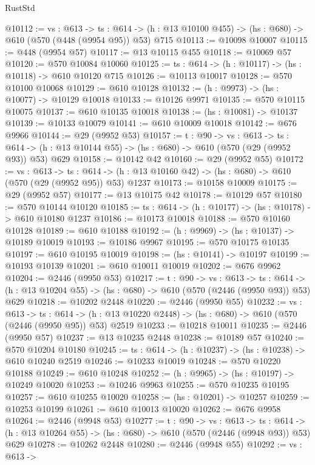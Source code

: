 \begin{lexlean}{RustStd}
\begin{coremodule}
@10112 := {vs : @613} ->
  {ts : @614} -> (h : @13 @10100 @455) -> (hs : @680) -> @610 (@570 (@448 (@9954 @95)) @53) @715
@10113 := @10098 @10007
@10115 := @448 (@9954 @57)
@10117 := @13 @10115 @455
@10118 := @10069 @57
@10120 := @570 @10084 @10060
@10125 := {ts : @614} -> (h : @10117) -> (hs : @10118) -> @610 @10120 @715
@10126 := @10113 @10017
@10128 := @570 @10100 @10068
@10129 := @610 @10128
@10132 := (h : @9973) -> (hs : @10077) -> @10129 @10018
@10133 := @10126 @9971
@10135 := @570 @10115 @10075
@10137 := @610 @10135 @10018
@10138 := (hs : @10081) -> @10137
@10139 := @10133 @10079
@10141 := @610 @10009 @10018
@10142 := @676 @9966
@10144 := @29 (@9952 @53)
@10157 := {t : @90} ->
  {vs : @613} ->
  {ts : @614} -> (h : @13 @10144 @55) -> (hs : @680) -> @610 (@570 (@29 (@9952 @93)) @53) @629
@10158 := @10142 @42
@10160 := @29 (@9952 @55)
@10172 := {vs : @613} ->
  {ts : @614} -> (h : @13 @10160 @42) -> (hs : @680) -> @610 (@570 (@29 (@9952 @95)) @53) @1237
@10173 := @10158 @10009
@10175 := @29 (@9952 @57)
@10177 := @13 @10175 @42
@10178 := @10129 @57
@10180 := @570 @10144 @10120
@10185 := {ts : @614} -> (h : @10177) -> (hs : @10178) -> @610 @10180 @1237
@10186 := @10173 @10018
@10188 := @570 @10160 @10128
@10189 := @610 @10188
@10192 := (h : @9969) -> (hs : @10137) -> @10189 @10019
@10193 := @10186 @9967
@10195 := @570 @10175 @10135
@10197 := @610 @10195 @10019
@10198 := (hs : @10141) -> @10197
@10199 := @10193 @10139
@10201 := @610 @10011 @10019
@10202 := @676 @9962
@10204 := @2446 (@9950 @53)
@10217 := {t : @90} ->
  {vs : @613} ->
  {ts : @614} -> (h : @13 @10204 @55) -> (hs : @680) -> @610 (@570 (@2446 (@9950 @93)) @53) @629
@10218 := @10202 @2448
@10220 := @2446 (@9950 @55)
@10232 := {vs : @613} ->
  {ts : @614} -> (h : @13 @10220 @2448) -> (hs : @680) -> @610 (@570 (@2446 (@9950 @95)) @53) @2519
@10233 := @10218 @10011
@10235 := @2446 (@9950 @57)
@10237 := @13 @10235 @2448
@10238 := @10189 @57
@10240 := @570 @10204 @10180
@10245 := {ts : @614} -> (h : @10237) -> (hs : @10238) -> @610 @10240 @2519
@10246 := @10233 @10019
@10248 := @570 @10220 @10188
@10249 := @610 @10248
@10252 := (h : @9965) -> (hs : @10197) -> @10249 @10020
@10253 := @10246 @9963
@10255 := @570 @10235 @10195
@10257 := @610 @10255 @10020
@10258 := (hs : @10201) -> @10257
@10259 := @10253 @10199
@10261 := @610 @10013 @10020
@10262 := @676 @9958
@10264 := @2446 (@9948 @53)
@10277 := {t : @90} ->
  {vs : @613} ->
  {ts : @614} -> (h : @13 @10264 @55) -> (hs : @680) -> @610 (@570 (@2446 (@9948 @93)) @53) @629
@10278 := @10262 @2448
@10280 := @2446 (@9948 @55)
@10292 := {vs : @613} ->

\end{coremodule}
\end{lexlean}
